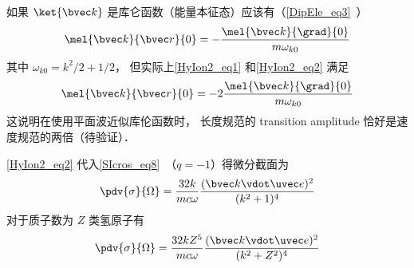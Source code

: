 如果 $\ket{\bvec k}$ 是库仑函数（能量本征态）应该有（\autoref{DipEle_eq3}~）
\begin{equation}
\mel{\bvec k}{\bvec r}{0} = -\frac{\mel{\bvec k}{\grad}{0}}{m\omega_{k0}}
\end{equation}
其中 $\omega_{k0} = k^2/2 + 1/2$， 但实际上\autoref{HyIon2_eq1} 和\autoref{HyIon2_eq2} 满足
\begin{equation}
\mel{\bvec k}{\bvec r}{0} = -2\frac{\mel{\bvec k}{\grad}{0}}{m\omega_{k0}}
\end{equation}
这说明在使用平面波近似库伦函数时， 长度规范的 transition amplitude 恰好是速度规范的两倍（待验证）．

\autoref{HyIon2_eq2} 代入\autoref{SIcros_eq8}~（$q = -1$）得微分截面为
\begin{equation}
\pdv{\sigma}{\Omega} = \frac{32 k}{mc\omega} \frac{(\bvec k \vdot \uvec e)^2}{(k^2 + 1)^4}
\end{equation}
对于质子数为 $Z$ 类氢原子有
\begin{equation}
\pdv{\sigma}{\Omega} = \frac{32 kZ^5}{mc\omega} \frac{(\bvec k \vdot \uvec e)^2}{(k^2 + Z^2)^4}
\end{equation}

